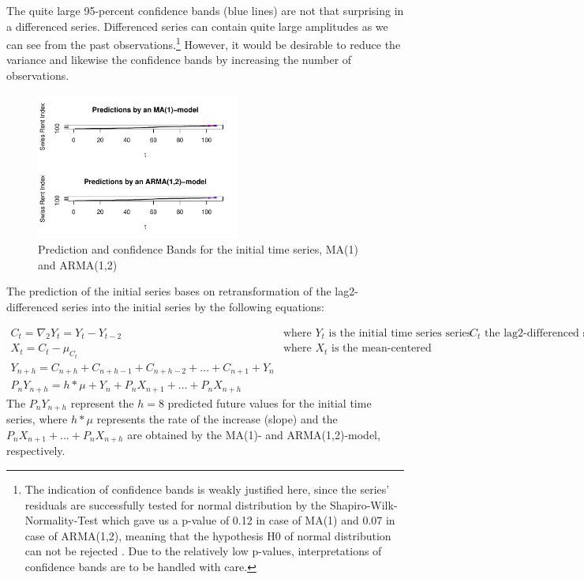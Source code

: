 \documentclass[11pt,a4paper]{article}
\begin{document}
The quite large 95-percent confidence bands (blue lines) are not that surprising in a differenced series.
Differenced series can contain quite large amplitudes as we can see from the past observations.\footnote{
    The indication of confidence bands is weakly justified here, since the series’ residuals are successfully tested for normal distribution by the Shapiro-Wilk-Normality-Test which gave us a p-value of 0.12 in case of MA(1) and 0.07 in case of ARMA(1,2), meaning that the hypothesis H0 of normal distribution can not be rejected \citep{shapiro}.
    Due to the relatively low p-values, interpretations of confidence bands are to be handled with care.
}
However, it would be desirable to reduce the variance and likewise the confidence bands by increasing the number of observations.
\begin{figure}
    \centering
    \includegraphics[width=0.6\textwidth]{pred_initial_series}
    \caption{Prediction and confidence Bands for the initial time series, MA(1) and ARMA(1,2)}
    \label{fig:pred_initial_series}
\end{figure}

The prediction of the initial series bases on retransformation of the lag2-differenced series into the initial series by the following equations: 

\begin{align*}
C_t = \nabla_2 Y_t = Y_t - Y_{t-2}  & \text{where $Y_t$ is the initial time series series and $C_t$ the lag2-differenced series} \\
X_t = C_t - \mu_{C_t} & \text{where $X_t$ is the mean-centered differenced series}\\
Y_{n+h} = C_{n+h} + C_{n+h-1} + C_{n+h-2} + ... + C_{n+1} + Y_n  \\
P_n Y_{n+h} = h*\mu + Y_n+ P_n X_{n+1} + ... + P_n X_{n+h}  
\end{align*}
The $P_n Y_{n+h}$ represent the $h=8$ predicted future values for the initial time series, where $h*\mu$ represents the rate of the increase (slope) and the $P_n X_{n+1} + ... + P_n X_{n+h} $ are obtained by the MA(1)- and ARMA(1,2)-model, respectively.
\end{document}
